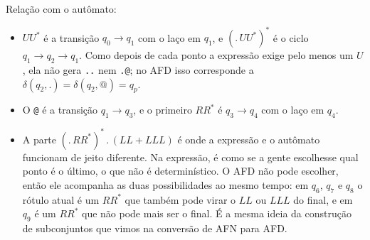 \documentclass[11pt,a4paper]{article}
\newcommand{\s}[1]{\texttt{#1}}
\newcommand{\q}[1]{$q_{#1}$}
\begin{document}
Relação com o autômato:
\begin{itemize}
  \item $UU^*$ é a transição $q_0 \to q_1$ com o laço em \q1, e $(\s{.}\,UU^*)^*$ é o ciclo $q_1 \to q_2 \to q_1$.
        Como depois de cada ponto a expressão exige pelo menos um $U$, ela não gera \s{..} nem \s{.@}; no AFD
        isso corresponde a $\delta(q_2, \s{.}) = \delta(q_2, \s{@}) = q_p$.
  \item O \s{@} é a transição $q_1 \to q_3$, e o primeiro $RR^*$ é $q_3 \to q_4$ com o laço em \q4.
  \item A parte $(\s{.}\,RR^*)^*\,\s{.}\,(LL+LLL)$ é onde a expressão e o autômato funcionam de jeito diferente.
        Na expressão, é como se a gente escolhesse qual ponto é o último, o que não é determinístico. O AFD não
        pode escolher, então ele acompanha as duas possibilidades ao mesmo tempo: em \q6, \q7 e \q8 o rótulo
        atual é um $RR^*$ que também pode virar o $LL$ ou $LLL$ do final, e em \q9 é um $RR^*$ que não pode mais
        ser o final. É a mesma ideia da construção de subconjuntos que vimos na conversão de AFN para AFD.
\end{itemize}
\end{document}

